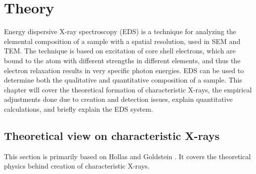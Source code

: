 \chapter{Theory}
\label{chap:theory}


Energy dispersive X-ray spectroscopy (EDS) is a technique for analyzing the elemental composition of a sample with a spatial resolution, used in SEM and TEM.
The technique is based on excitation of core shell electrons, which are bound to the atom with different strengths in different elements, and thus the electron relaxation results in very specific photon energies.
EDS can be used to determine both the qualitative and quantitative composition of a sample.
This chapter will cover the theoretical formation of characteristic X-rays, the empirical adjustments done due to creation and detection issues, explain quantitative calculations, and briefly explain the EDS system.









\section{Theoretical view on characteristic X-rays}
\label{sec:theory:theoreticalxray}


This section is primarily based on Hollas \cite[Ch. 8.2]{hollas_modern_2004} and Goldstein \cite[Ch. 4.2]{goldstein_scanning_2018}.
It covers the theoretical physics behind creation of characteristic X-rays.










